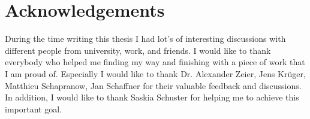 \chapter*{Acknowledgements}
During the time writing this thesis I had lot's of interesting discussions with different people from university, work, and friends. I would like to thank everybody who helped me finding my way and finishing with a piece of work that I am proud of. Especially I would like to thank Dr. Alexander Zeier, Jens Kr\"uger, Matthieu Schapranow, Jan Schaffner for their valuable feedback and discussions. In addition, I would like to thank Saskia Schuster for helping me to achieve this important goal.
